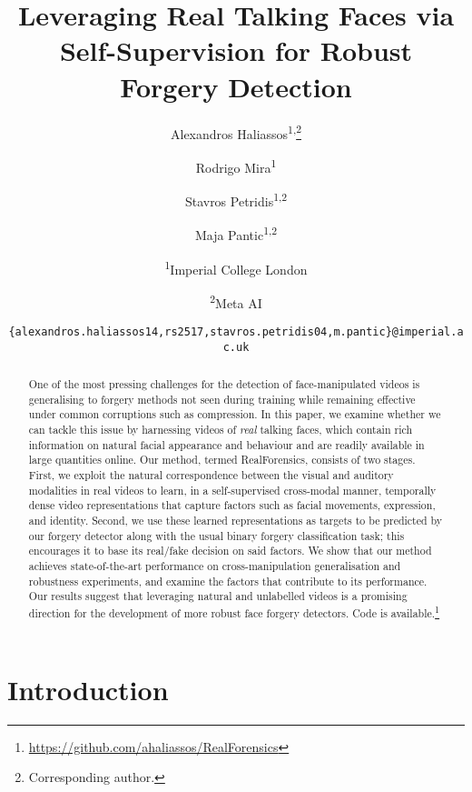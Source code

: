 \documentclass[10pt,twocolumn,letterpaper]{article}
\begin{document}
\title{Leveraging Real Talking Faces via Self-Supervision for Robust Forgery Detection}

\author{Alexandros Haliassos\textsuperscript{1,}\thanks{Corresponding author.}
\and
Rodrigo Mira\textsuperscript{1}
\and
Stavros Petridis\textsuperscript{1,2}
\and
Maja Pantic\textsuperscript{1,2}
\and
\textsuperscript{1}Imperial College London
\and
\textsuperscript{2}Meta AI
\and
{\tt\small \{alexandros.haliassos14,rs2517,stavros.petridis04,m.pantic\}@imperial.ac.uk}
}
\maketitle

\begin{abstract}
One of the most pressing challenges for the detection of face-manipulated videos is generalising to forgery methods not seen during training while remaining effective under common corruptions such as compression. In this paper, we examine whether we can tackle this issue by harnessing videos of \textit{real} talking faces, which contain rich information on natural facial appearance and behaviour and are readily available in large quantities online. Our method, termed RealForensics, consists of two stages. First, we exploit the natural correspondence between the visual and auditory modalities in real videos to learn, in a self-supervised cross-modal manner, temporally dense video representations that capture factors such as facial movements, expression, and identity. Second, we use these learned representations as targets to be predicted by our forgery detector along with the usual binary forgery classification task; this encourages it to base its real/fake decision on said factors. We show that our method achieves state-of-the-art performance on cross-manipulation generalisation and robustness experiments, and examine the factors that contribute to its performance. Our results suggest that leveraging natural and unlabelled videos is a promising direction for the development of more robust face forgery detectors. Code is available.\footnote{ {\url{https://github.com/ahaliassos/RealForensics}}}
 
\end{abstract}

\section{Introduction}
\label{sec:intro}
\end{document}
